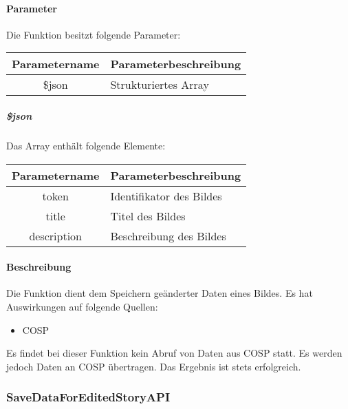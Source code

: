 \paragraph{Parameter} Die Funktion besitzt folgende Parameter:
\begin{table}[H]
	\begin{tabular}{|c|p{11cm}|}
		\hline
		\textbf{Parametername} & \textbf{Parameterbeschreibung} \\ \hline
		\$json & Strukturiertes Array \\ \hline
	\end{tabular}
\end{table}
\subparagraph{\$json}Das Array enthält folgende Elemente:
\begin{table}[H]
	\begin{tabular}{|c|p{11cm}|}
		\hline
		\textbf{Parametername} & \textbf{Parameterbeschreibung} \\ \hline
		token & Identifikator des Bildes \\ \hline
		title & Titel des Bildes \\ \hline
		description & Beschreibung des Bildes \\ \hline
	\end{tabular}
\end{table}
\paragraph{Beschreibung} Die Funktion dient dem Speichern geänderter Daten eines Bildes. Es hat Auswirkungen auf folgende Quellen:
\begin{itemize}
	\item COSP
\end{itemize}
Es findet bei dieser Funktion kein Abruf von Daten aus {\glqq COSP\grqq} statt. Es werden jedoch Daten an {\glqq COSP\grqq} übertragen. Das Ergebnis ist stets erfolgreich.
\subsubsection{SaveDataForEditedStoryAPI}

